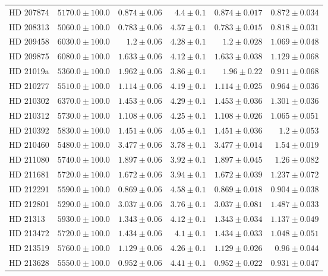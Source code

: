 \begin{longtable*}{lrrrrr}
HD 207874 & $5170.0\pm 100.0$ & $0.874\pm 0.06$ & $4.4\pm 0.1$ & $0.874\pm 0.017$ & $0.872\pm 0.034$ \\ 
HD 208313 & $5060.0\pm 100.0$ & $0.783\pm 0.06$ & $4.57\pm 0.1$ & $0.783\pm 0.015$ & $0.818\pm 0.031$ \\ 
HD 209458 & $6030.0\pm 100.0$ & $1.2\pm 0.06$ & $4.28\pm 0.1$ & $1.2\pm 0.028$ & $1.069\pm 0.048$ \\ 
HD 209875 & $6080.0\pm 100.0$ & $1.633\pm 0.06$ & $4.12\pm 0.1$ & $1.633\pm 0.038$ & $1.129\pm 0.068$ \\ 
HD 21019a & $5360.0\pm 100.0$ & $1.962\pm 0.06$ & $3.86\pm 0.1$ & $1.96\pm 0.22$ & $0.911\pm 0.068$ \\ 
HD 210277 & $5510.0\pm 100.0$ & $1.114\pm 0.06$ & $4.19\pm 0.1$ & $1.114\pm 0.025$ & $0.964\pm 0.036$ \\ 
HD 210302 & $6370.0\pm 100.0$ & $1.453\pm 0.06$ & $4.29\pm 0.1$ & $1.453\pm 0.036$ & $1.301\pm 0.036$ \\ 
HD 210312 & $5730.0\pm 100.0$ & $1.108\pm 0.06$ & $4.25\pm 0.1$ & $1.108\pm 0.026$ & $1.065\pm 0.051$ \\ 
HD 210392 & $5830.0\pm 100.0$ & $1.451\pm 0.06$ & $4.05\pm 0.1$ & $1.451\pm 0.036$ & $1.2\pm 0.053$ \\ 
HD 210460 & $5480.0\pm 100.0$ & $3.477\pm 0.06$ & $3.78\pm 0.1$ & $3.477\pm 0.014$ & $1.54\pm 0.019$ \\ 
HD 211080 & $5740.0\pm 100.0$ & $1.897\pm 0.06$ & $3.92\pm 0.1$ & $1.897\pm 0.045$ & $1.26\pm 0.082$ \\ 
HD 211681 & $5720.0\pm 100.0$ & $1.672\pm 0.06$ & $3.94\pm 0.1$ & $1.672\pm 0.039$ & $1.237\pm 0.072$ \\ 
HD 212291 & $5590.0\pm 100.0$ & $0.869\pm 0.06$ & $4.58\pm 0.1$ & $0.869\pm 0.018$ & $0.904\pm 0.038$ \\ 
HD 212801 & $5290.0\pm 100.0$ & $3.037\pm 0.06$ & $3.76\pm 0.1$ & $3.037\pm 0.081$ & $1.487\pm 0.033$ \\ 
HD 21313 & $5930.0\pm 100.0$ & $1.343\pm 0.06$ & $4.12\pm 0.1$ & $1.343\pm 0.034$ & $1.137\pm 0.049$ \\ 
HD 213472 & $5720.0\pm 100.0$ & $1.434\pm 0.06$ & $4.1\pm 0.1$ & $1.434\pm 0.033$ & $1.048\pm 0.051$ \\ 
HD 213519 & $5760.0\pm 100.0$ & $1.129\pm 0.06$ & $4.26\pm 0.1$ & $1.129\pm 0.026$ & $0.96\pm 0.044$ \\ 
HD 213628 & $5550.0\pm 100.0$ & $0.952\pm 0.06$ & $4.41\pm 0.1$ & $0.952\pm 0.022$ & $0.931\pm 0.047$ \\ 

\end{longtable*}
